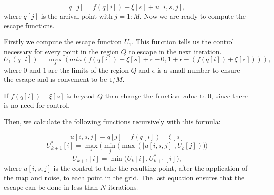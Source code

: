\begin{equation}
    q[j] = f(q[i]) +\xi[s] +u[i,s,j],
\end{equation}
where $q[j]$ is the arrival point with $j=1:M$. Now we are ready to compute the escape functions.

Firstly we compute the escape function $U_1$. This function tells us the control necessary for every point in the region $Q$ to escape in the next iteration. 
\begin{equation}
U_1(q[i]) = \max\limits_{s}(min(f(q[i]) + \xi[s] + \epsilon - 0, 1 + \epsilon - (f(q[i]) + \xi[s]))),
\end{equation}
where $0$ and $1$ are the limits of the region $Q$ and $\epsilon$ is a small number to ensure the escape and is convenient to be $1/M$.

If $f(q[i]) + \xi[s]$ is beyond $Q$ then change the function value to $0$, since there is no need for control.

Then, we calculate the following functions recursively with this formula:

\begin{equation*}
u[i,s,j] = q[j] - f(q[i]) - \xi[s]
\end{equation*}
\begin{equation*}
U^{*}_{k+1}[i]=\max_s\Big(\min_j\big(\max(|u[i,s,j]|,U_k[j])\big)\Big)
\end{equation*}
\begin{equation}
U_{k+1}[i]=\min\bigg(U_k[i],U^{*}_{k+1}[i]\bigg),
\label{equ:QuickEscapeFunctions}
\end{equation}
where $u[i,s,j]$ is the control to take the resulting point, after the application of the map and noise, to each point in the grid. The last equation ensures that the escape can be done in less than $N$ iterations.

